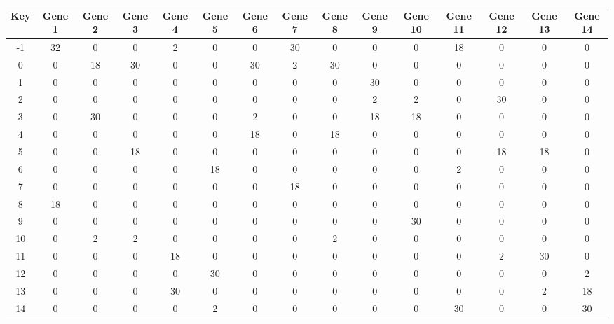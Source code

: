 \begin{tabular}{|c|c|c|c|c|c|c|c|c|c|c|c|c|c|c|}
\hline
Key & Gene 1 & Gene 2 & Gene 3 & Gene 4 & Gene 5 & Gene 6 & Gene 7 & Gene 8 & Gene 9 & Gene 10 & Gene 11 & Gene 12 & Gene 13 & Gene 14 \\
\hline
-1 & 32 & 0 & 0 & 2 & 0 & 0 & 30 & 0 & 0 & 0 & 18 & 0 & 0 & 0 \\
0 & 0 & 18 & 30 & 0 & 0 & 30 & 2 & 30 & 0 & 0 & 0 & 0 & 0 & 0 \\
1 & 0 & 0 & 0 & 0 & 0 & 0 & 0 & 0 & 30 & 0 & 0 & 0 & 0 & 0 \\
2 & 0 & 0 & 0 & 0 & 0 & 0 & 0 & 0 & 2 & 2 & 0 & 30 & 0 & 0 \\
3 & 0 & 30 & 0 & 0 & 0 & 2 & 0 & 0 & 18 & 18 & 0 & 0 & 0 & 0 \\
4 & 0 & 0 & 0 & 0 & 0 & 18 & 0 & 18 & 0 & 0 & 0 & 0 & 0 & 0 \\
5 & 0 & 0 & 18 & 0 & 0 & 0 & 0 & 0 & 0 & 0 & 0 & 18 & 18 & 0 \\
6 & 0 & 0 & 0 & 0 & 18 & 0 & 0 & 0 & 0 & 0 & 2 & 0 & 0 & 0 \\
7 & 0 & 0 & 0 & 0 & 0 & 0 & 18 & 0 & 0 & 0 & 0 & 0 & 0 & 0 \\
8 & 18 & 0 & 0 & 0 & 0 & 0 & 0 & 0 & 0 & 0 & 0 & 0 & 0 & 0 \\
9 & 0 & 0 & 0 & 0 & 0 & 0 & 0 & 0 & 0 & 30 & 0 & 0 & 0 & 0 \\
10 & 0 & 2 & 2 & 0 & 0 & 0 & 0 & 2 & 0 & 0 & 0 & 0 & 0 & 0 \\
11 & 0 & 0 & 0 & 18 & 0 & 0 & 0 & 0 & 0 & 0 & 0 & 2 & 30 & 0 \\
12 & 0 & 0 & 0 & 0 & 30 & 0 & 0 & 0 & 0 & 0 & 0 & 0 & 0 & 2 \\
13 & 0 & 0 & 0 & 30 & 0 & 0 & 0 & 0 & 0 & 0 & 0 & 0 & 2 & 18 \\
14 & 0 & 0 & 0 & 0 & 2 & 0 & 0 & 0 & 0 & 0 & 30 & 0 & 0 & 30 \\
\hline
\end{tabular}